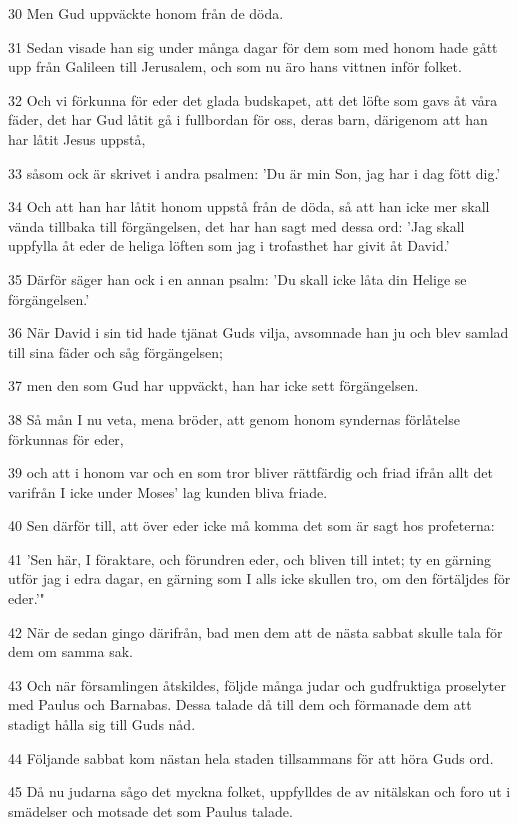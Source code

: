 \par 30 Men Gud uppväckte honom från de döda.
\par 31 Sedan visade han sig under många dagar för dem som med honom hade gått upp från Galileen till Jerusalem, och som nu äro hans vittnen inför folket.
\par 32 Och vi förkunna för eder det glada budskapet, att det löfte som gavs åt våra fäder, det har Gud låtit gå i fullbordan för oss, deras barn, därigenom att han har låtit Jesus uppstå,
\par 33 såsom ock är skrivet i andra psalmen: 'Du är min Son, jag har i dag fött dig.'
\par 34 Och att han har låtit honom uppstå från de döda, så att han icke mer skall vända tillbaka till förgängelsen, det har han sagt med dessa ord: 'Jag skall uppfylla åt eder de heliga löften som jag i trofasthet har givit åt David.'
\par 35 Därför säger han ock i en annan psalm: 'Du skall icke låta din Helige se förgängelsen.'
\par 36 När David i sin tid hade tjänat Guds vilja, avsomnade han ju och blev samlad till sina fäder och såg förgängelsen;
\par 37 men den som Gud har uppväckt, han har icke sett förgängelsen.
\par 38 Så mån I nu veta, mena bröder, att genom honom syndernas förlåtelse förkunnas för eder,
\par 39 och att i honom var och en som tror bliver rättfärdig och friad ifrån allt det varifrån I icke under Moses' lag kunden bliva friade.
\par 40 Sen därför till, att över eder icke må komma det som är sagt hos profeterna:
\par 41 'Sen här, I föraktare, och förundren eder, och bliven till intet; ty en gärning utför jag i edra dagar, en gärning som I alls icke skullen tro, om den förtäljdes för eder.'"
\par 42 När de sedan gingo därifrån, bad men dem att de nästa sabbat skulle tala för dem om samma sak.
\par 43 Och när församlingen åtskildes, följde många judar och gudfruktiga proselyter med Paulus och Barnabas. Dessa talade då till dem och förmanade dem att stadigt hålla sig till Guds nåd.
\par 44 Följande sabbat kom nästan hela staden tillsammans för att höra Guds ord.
\par 45 Då nu judarna sågo det myckna folket, uppfylldes de av nitälskan och foro ut i smädelser och motsade det som Paulus talade.
